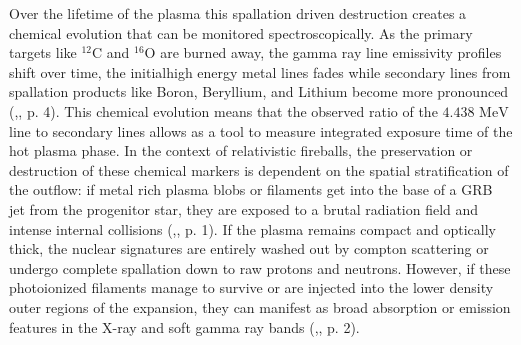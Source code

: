 \documentclass{aa} %
\begin{document}
Over the lifetime of the plasma this spallation driven destruction creates a chemical evolution that can be monitored spectroscopically. As the primary targets like $^{12}\text{C}$ and $^{16}\text{O}$ are burned away, the gamma ray line emissivity profiles shift over time, the initialhigh energy metal lines fades while secondary lines from spallation products like Boron, Beryllium, and Lithium become more pronounced (\citet{Boettcheretal1996},\citet{Kafexhiuetal2019}, p. 4). This chemical evolution means that the observed ratio of the $4.438\text{ MeV}$ line to secondary lines allows as a tool to measure integrated exposure time of the hot plasma phase.
In the context of relativistic fireballs, the preservation or destruction of these chemical markers is dependent on the spatial stratification of the outflow: if metal rich plasma blobs or filaments get into the base of a GRB jet from the progenitor star, they are exposed to a brutal radiation field and intense internal collisions (\citet{Boettcheretal1996},\citet{Haileyetal1999}, p. 1). If the plasma remains compact and optically thick, the nuclear signatures are entirely washed out by compton scattering or undergo complete spallation down to raw protons and neutrons. However, if these photoionized filaments manage to survive or are injected into the lower density outer regions of the expansion, they can manifest as broad absorption or emission features in the X-ray and soft gamma ray bands (\citet{Boettcheretal1996},\citet{Haileyetal1999}, p. 2). 
\end{document}
